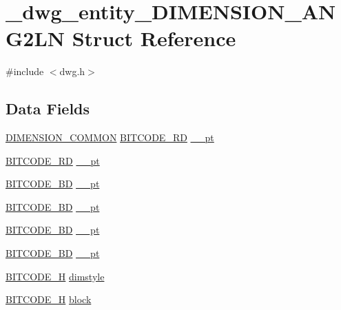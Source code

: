 \hypertarget{struct__dwg__entity__DIMENSION__ANG2LN}{\section{\-\_\-dwg\-\_\-entity\-\_\-\-D\-I\-M\-E\-N\-S\-I\-O\-N\-\_\-\-A\-N\-G2\-L\-N \-Struct \-Reference}
\label{struct__dwg__entity__DIMENSION__ANG2LN}
}


{\ttfamily \#include $<$dwg.\-h$>$}

\subsection*{\-Data \-Fields}
\begin{DoxyCompactItemize}
\item 
\hyperlink{dwg_8h_a334d626d7e4a0a1af39036446dfa82c4}{\-D\-I\-M\-E\-N\-S\-I\-O\-N\-\_\-\-C\-O\-M\-M\-O\-N} \hyperlink{dwg_8h_a1d23a9bc9a02453876b244dc6706f6a6}{\-B\-I\-T\-C\-O\-D\-E\-\_\-R\-D} \hyperlink{struct__dwg__entity__DIMENSION__ANG2LN_a7cba90cee056e8053fea3d21d29ccb26}{\-\_\-\_\-pt}
\item 
\hyperlink{dwg_8h_a1d23a9bc9a02453876b244dc6706f6a6}{\-B\-I\-T\-C\-O\-D\-E\-\_\-R\-D} \hyperlink{struct__dwg__entity__DIMENSION__ANG2LN_a0680c08ade3edacecb0278896633ea6f}{\-\_\-\_\-pt}
\item 
\hyperlink{dwg_8h_a00698ef1bb072aa0a9360c6fc1c57587}{\-B\-I\-T\-C\-O\-D\-E\-\_\-B\-D} \hyperlink{struct__dwg__entity__DIMENSION__ANG2LN_a3f38b5b3f30a49e5f0904194561dbb85}{\-\_\-\_\-pt}
\item 
\hyperlink{dwg_8h_a00698ef1bb072aa0a9360c6fc1c57587}{\-B\-I\-T\-C\-O\-D\-E\-\_\-B\-D} \hyperlink{struct__dwg__entity__DIMENSION__ANG2LN_a5762db6cdc99323119352fe5d998a1d7}{\-\_\-\_\-pt}
\item 
\hyperlink{dwg_8h_a00698ef1bb072aa0a9360c6fc1c57587}{\-B\-I\-T\-C\-O\-D\-E\-\_\-B\-D} \hyperlink{struct__dwg__entity__DIMENSION__ANG2LN_ad4ab9f6a14147df23fd904f35b8328cc}{\-\_\-\_\-pt}
\item 
\hyperlink{dwg_8h_a00698ef1bb072aa0a9360c6fc1c57587}{\-B\-I\-T\-C\-O\-D\-E\-\_\-B\-D} \hyperlink{struct__dwg__entity__DIMENSION__ANG2LN_a5d2b1cc4793e5ce5eb23aeae886575aa}{\-\_\-\_\-pt}
\item 
\hyperlink{dwg_8h_a7c700e94e047a97ba8c24bdfe4029dc3}{\-B\-I\-T\-C\-O\-D\-E\-\_\-\-H} \hyperlink{struct__dwg__entity__DIMENSION__ANG2LN_a350ecbb6cd8e5dc7c59cb12c9dcca1a1}{dimstyle}
\item 
\hyperlink{dwg_8h_a7c700e94e047a97ba8c24bdfe4029dc3}{\-B\-I\-T\-C\-O\-D\-E\-\_\-\-H} \hyperlink{struct__dwg__entity__DIMENSION__ANG2LN_a2f58203b3df1bcd952ed01e7cea3c26b}{block}
\end{DoxyCompactItemize}



